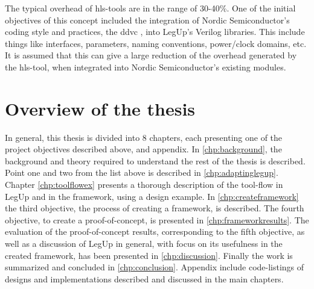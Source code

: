 \begin{enumerate}
 The typical overhead of \gls{hls}-tools are in the range of 30-40\%. One of the initial objectives of this concept included the integration of  Nordic Semiconductor's coding style and practices, the \gls{ddvc} \cite{nordicddvc}, into LegUp's Verilog libraries. This include things like interfaces, parameters, naming conventions, power/clock domains, etc. It is assumed that this can give a large reduction of the overhead generated by the \gls{hls}-tool, when integrated into Nordic Semiconductor's existing modules.
\end{enumerate}

\section{Overview of the thesis}
In general, this thesis is divided into 8 chapters, each presenting one of the project objectives described above, and appendix. In \cref{chp:background}, the background and theory required to understand the rest of the thesis is described. Point one and two from the list above is described in \cref{chp:adaptinglegup}. Chapter \ref{chp:toolflowex} presents a thorough description of the tool-flow in LegUp and in the framework, using a design example. In \cref{chp:createframework} the third objective, the process of creating a framework, is described. The fourth objective, to create a proof-of-concept, is presented in \cref{chp:frameworkresults}. The evaluation of the proof-of-concept results, corresponding to the fifth objective, as well as a discussion of LegUp in general, with focus on its usefulness in the created framework, has been presented in \cref{chp:discussion}. Finally the work is summarized and concluded in \cref{chp:conclusion}. Appendix include code-listings of designs and implementations described and discussed in the main chapters.

